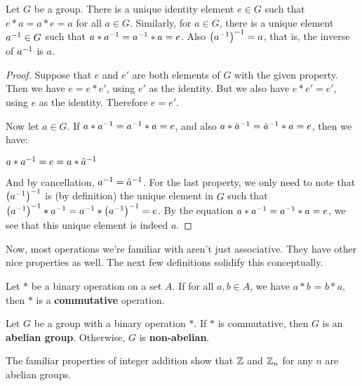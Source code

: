 \begin{theorem}
Let $G$ be a group. There is a unique identity element $e \in G$ such that $e*a = a*e = a$ for all $a \in G$. Similarly, for $a \in G$, there is a unique element $\inv{a} \in G$ such that $a*\inv{a} = \inv{a}*a = e$. Also $\left(\inv{a}\right)^{-1} = a$, that is, the inverse of $\inv a$ is $a$.
\end{theorem}

\begin{proof}
Suppose that $e$ and $e'$ are both elements of $G$ with the given property. Then we have $e = e*e'$, using $e'$ as the identity. But we also have $e*e' = e'$, using $e$ as the identity. Therefore $e = e'$.

Now let $a \in G$. If $a*\inv{a} = \inv{a}*a = e$, and also $a*\inv{\tilde{a}} = \inv{\tilde{a}}*a = e$, then we have:

\begin{center}
    $a*\inv{a} = e = a*{\inv{\tilde{a}}}$
\end{center}

And by cancellation, $\inv{a} = \inv{\tilde{a}}$. For the last property, we only need to note that $\left(\inv{a}\right)^{-1}$ is (by definition) the unique element in $G$ such that $\left(\inv{a}\right)^{-1} * \inv{a} = \inv{a} * \left(\inv{a}\right)^{-1} = e$. By the equation $a * \inv{a} = \inv{a} * a = e$, we see that this unique element is indeed $a$.

\end{proof}

Now, most operations we're familiar with aren't just associative. They have other nice properties as well. The next few definitions solidify this conceptually.

\begin{definition}
Let $*$ be a binary operation on a set $A$. \extra If for all $a, b \in A$, we have $a * b$ = $b * a$, then $*$ is a \textbf{commutative} operation.
\end{definition}

\begin{definition}
Let $G$ be a group with a binary operation $*$. \extra If $*$ is commutative, then $G$ is an \textbf{abelian group}. Otherwise, $G$ is \textbf{non-abelian}.
\end{definition}

\begin{example}
The familiar properties of integer addition show that $\z$ and $\zn[n]$ for any $n$ are abelian groups.
\end{example}

